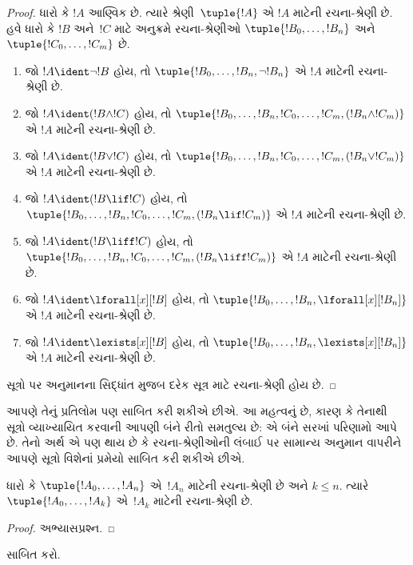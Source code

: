 \begin{proof}
ધારો કે $!A$ આણ્વિક છે. ત્યારે શ્રેણી~$\tuple{!A}$ એ $!A$ માટેની
રચના-શ્રેણી છે.
હવે ધારો કે $!B$ અને~$!C$ માટે અનુક્રમે રચના-શ્રેણીઓ
$\tuple{!B_0,\dotsc,!B_n}$ અને $\tuple{!C_0,\dotsc,!C_m}$ છે.
\begin{enumerate}
  \item જો $!A \ident \lnot !B$ હોય,
      તો $\tuple{!B_0,\dotsc,!B_n,\lnot !B_n}$
      એ $!A$ માટેની રચના-શ્રેણી છે.
  \item જો $!A \ident (!B \land !C)$ હોય,
      તો $\tuple{!B_0,\dotsc,!B_n,!C_0,\dotsc,!C_m,(!B_n \land !C_m)}$
      એ $!A$ માટેની રચના-શ્રેણી છે.
  \item જો $!A \ident (!B \lor !C)$ હોય,
      તો $\tuple{!B_0,\dotsc,!B_n,!C_0,\dotsc,!C_m,(!B_n \lor !C_m)}$
      એ $!A$ માટેની રચના-શ્રેણી છે.
  \item જો $!A \ident (!B \lif !C)$ હોય,
      તો $\tuple{!B_0,\dotsc,!B_n,!C_0,\dotsc,!C_m,(!B_n \lif !C_m)}$
      એ $!A$ માટેની રચના-શ્રેણી છે.
  \item જો $!A \ident (!B \liff !C)$ હોય,
      તો $\tuple{!B_0,\dotsc,!B_n,!C_0,\dotsc,!C_m,(!B_n \liff !C_m)}$
      એ $!A$ માટેની રચના-શ્રેણી છે.
  \item જો $!A \ident \lforall[x][!B]$ હોય,
      તો $\tuple{!B_0,\dotsc,!B_n,\lforall[x][!B_n]}$
      એ $!A$ માટેની રચના-શ્રેણી છે.
  \item જો $!A \ident \lexists[x][!B]$ હોય,
      તો $\tuple{!B_0,\dotsc,!B_n,\lexists[x][!B_n]}$
      એ $!A$ માટેની રચના-શ્રેણી છે.
\end{enumerate}
સૂત્રો પર અનુમાનના સિદ્ધાંત મુજબ દરેક સૂત્ર માટે
રચના-શ્રેણી હોય છે.
\end{proof}

આપણે તેનું પ્રતિલોમ પણ સાબિત કરી શકીએ છીએ. આ મહત્વનું છે, કારણ કે
તેનાથી સૂત્રો વ્યાખ્યાયિત કરવાની આપણી બંને રીતો સમતુલ્ય છે: એ બંને
સરખાં પરિણામો આપે છે. તેનો અર્થ એ પણ થાય છે કે રચના-શ્રેણીઓની લંબાઈ
પર સામાન્ય અનુમાન વાપરીને આપણે સૂત્રો વિશેનાં પ્રમેયો સાબિત કરી
શકીએ છીએ.

\begin{lem}
ધારો કે $\tuple{!A_0,\dotsc,!A_n}$ એ~$!A_n$ માટેની રચના-શ્રેણી છે
અને $k \leq n$. ત્યારે $\tuple{!A_0,\dotsc,!A_k}$ એ~$!A_k$ માટેની
રચના-શ્રેણી છે.
\end{lem}

\begin{proof}
અભ્યાસપ્રશ્ન.
\end{proof}

\begin{prob}
 સાબિત કરો.
\end{prob}

